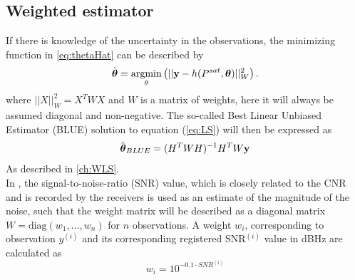 \subsection{Weighted estimator}\label{globalWEstimator}
If there is knowledge of the uncertainty in the observations, the minimizing function in \ref{eq:thetaHat} can be described by
\begin{align}\label{eq:theta_hatW}
\hat{{\boldsymbol \theta}}=\operatorname*{argmin}_{\bf \theta}\left(||{\bf y}-h(P^{sat},{\boldsymbol \theta})||^2_W\right).
\end{align}
where $||X||^2_W=X^TWX$ and $W$ is a matrix of weights, here it will always be assumed diagonal and non-negative. The so-called Best Linear Unbiased Estimator (BLUE) solution to equation (\ref{eq:LS}) will then be expressed as 
\begin{align}\label{eq:WLS}
\hat{{\boldsymbol \theta}}_{BLUE}=(H^T W H)^{-1}H^T W{\bf y}
\end{align}
As described in \ref{ch:WLS}.\\
In \cite{Brunner1999}, the signal-to-noise-ratio (SNR) value, which is closely related to the CNR and is recorded by the receivers is used as an estimate of the magnitude of the noise, such that the weight matrix will be described as a diagonal matrix $W=\text{diag}\left(w_1,\dots, w_n\right)$ 
for $n$ observations. A weight $w_i$, corresponding to observation $y^{(i)}$ and its corresponding registered SNR$^{(i)}$ value in dBHz are calculated as
\begin{equation}\label{SNRWeights}
w_i=10^{-0.1\cdot SNR^{(i)}}
\end{equation}
